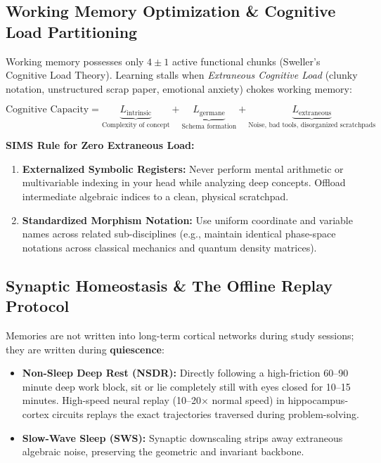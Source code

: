 \documentclass[11pt,a4paper]{article}
\begin{document}
\subsection{Working Memory Optimization \& Cognitive Load Partitioning}
Working memory possesses only $4 \pm 1$ active functional chunks (Sweller's Cognitive Load Theory). Learning stalls when \textit{Extraneous Cognitive Load} (clunky notation, unstructured scrap paper, emotional anxiety) chokes working memory:

\begin{equation}
    \text{Cognitive Capacity} = \underbrace{L_{\text{intrinsic}}}_{\text{Complexity of concept}} + \underbrace{L_{\text{germane}}}_{\text{Schema formation}} + \underbrace{L_{\text{extraneous}}}_{\text{Noise, bad tools, disorganized scratchpads}}
\end{equation}

\textbf{SIMS Rule for Zero Extraneous Load:}
\begin{enumerate}
    \item \textbf{Externalized Symbolic Registers:} Never perform mental arithmetic or multivariable indexing in your head while analyzing deep concepts. Offload intermediate algebraic indices to a clean, physical scratchpad.
    \item \textbf{Standardized Morphism Notation:} Use uniform coordinate and variable names across related sub-disciplines (e.g., maintain identical phase-space notations across classical mechanics and quantum density matrices).
\end{enumerate}

\subsection{Synaptic Homeostasis \& The Offline Replay Protocol}
Memories are not written into long-term cortical networks during study sessions; they are written during \textbf{quiescence}:
\begin{itemize}
    \item \textbf{Non-Sleep Deep Rest (NSDR):} Directly following a high-friction 60--90 minute deep work block, sit or lie completely still with eyes closed for 10--15 minutes. High-speed neural replay (10--20$\times$ normal speed) in hippocampus-cortex circuits replays the exact trajectories traversed during problem-solving.
    \item \textbf{Slow-Wave Sleep (SWS):} Synaptic downscaling strips away extraneous algebraic noise, preserving the geometric and invariant backbone.
\end{itemize}
\end{document}

